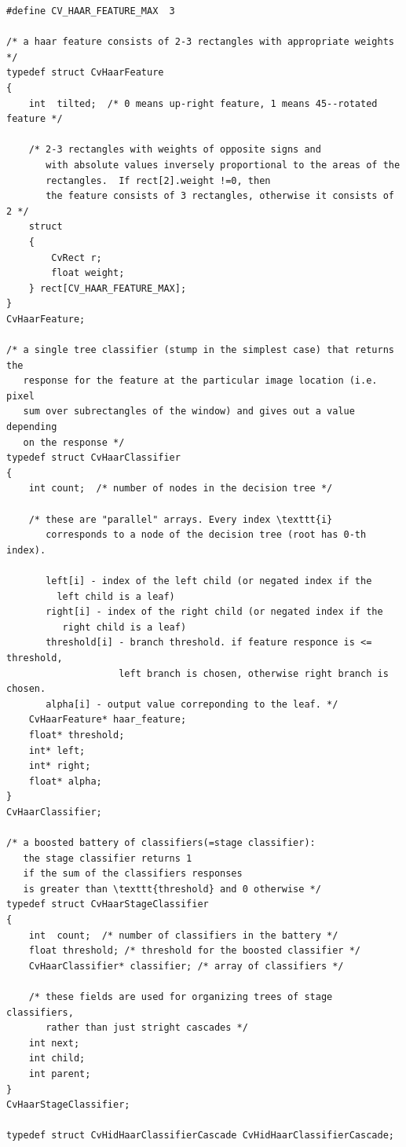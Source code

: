 \begin{lstlisting}
#define CV_HAAR_FEATURE_MAX  3

/* a haar feature consists of 2-3 rectangles with appropriate weights */
typedef struct CvHaarFeature
{
    int  tilted;  /* 0 means up-right feature, 1 means 45--rotated feature */

    /* 2-3 rectangles with weights of opposite signs and
       with absolute values inversely proportional to the areas of the 
       rectangles.  If rect[2].weight !=0, then
       the feature consists of 3 rectangles, otherwise it consists of 2 */
    struct
    {
        CvRect r;
        float weight;
    } rect[CV_HAAR_FEATURE_MAX];
}
CvHaarFeature;

/* a single tree classifier (stump in the simplest case) that returns the 
   response for the feature at the particular image location (i.e. pixel 
   sum over subrectangles of the window) and gives out a value depending 
   on the response */
typedef struct CvHaarClassifier
{
    int count;  /* number of nodes in the decision tree */

    /* these are "parallel" arrays. Every index \texttt{i}
       corresponds to a node of the decision tree (root has 0-th index).

       left[i] - index of the left child (or negated index if the 
		 left child is a leaf)
       right[i] - index of the right child (or negated index if the 
		  right child is a leaf)
       threshold[i] - branch threshold. if feature responce is <= threshold, 
                    left branch is chosen, otherwise right branch is chosen.
       alpha[i] - output value correponding to the leaf. */
    CvHaarFeature* haar_feature;
    float* threshold;
    int* left;
    int* right;
    float* alpha;
}
CvHaarClassifier;

/* a boosted battery of classifiers(=stage classifier):
   the stage classifier returns 1
   if the sum of the classifiers responses
   is greater than \texttt{threshold} and 0 otherwise */
typedef struct CvHaarStageClassifier
{
    int  count;  /* number of classifiers in the battery */
    float threshold; /* threshold for the boosted classifier */
    CvHaarClassifier* classifier; /* array of classifiers */

    /* these fields are used for organizing trees of stage classifiers,
       rather than just stright cascades */
    int next;
    int child;
    int parent;
}
CvHaarStageClassifier;

typedef struct CvHidHaarClassifierCascade CvHidHaarClassifierCascade;


\end{lstlisting}
